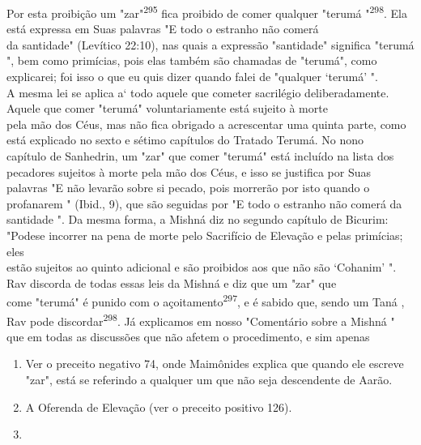 \begin{itemize}
\begin{enumrate}
\begin{itemize}
\begin{itemize}
\begin{itemize}
Por esta proibição um "zar"\textsuperscript{295} fica proibido de comer
qualquer "terumá
"\textsuperscript{298}. Ela está expressa em Suas palavras "E todo o
estranho não comerá\\
da santidade" (Levítico 22:10), nas quais a expressão "santidade"
significa "terumá
", bem como primícias, pois elas também são chamadas de "terumá",
como
explicarei; foi isso o que eu quis dizer quando falei de "qualquer
`terumá' ".\\
A mesma lei se aplica a` todo aquele que cometer sacrilégio
deliberadamente.\\
Aquele que comer "terumá" voluntariamente está sujeito à morte\\
pela mão dos Céus, mas não fica obrigado a acrescentar uma quinta parte,
como
está explicado no sexto e sétimo capítulos do Tratado Terumá. No
nono\\
capítulo de Sanhedrin, um "zar" que comer "terumá" está incluído na
lista dos\\
pecadores sujeitos à morte pela mão dos Céus, e isso se justifica por
Suas palavras
"E não levarão sobre si pecado, pois morrerão por isto quando o
profanarem
" (Ibid., 9), que são seguidas por "E todo o estranho não comerá da
santidade
". Da mesma forma, a Mishná diz no segundo capítulo de Bicurim:
"Podese
incorrer na pena de morte pelo Sacrifício de Elevação e pelas
primícias; eles\\
estão sujeitos ao quinto adicional e são proibidos aos que não são
`Cohanim' ".\\
Rav discorda de todas essas leis da Mishná e diz que um "zar" que\\
come "terumá" é punido com o açoitamento\textsuperscript{297}, e é
sabido que, sendo um Taná
, Rav pode discordar\textsuperscript{298}. Já explicamos em nosso
"Comentário sobre a Mishná
" que em todas as discussões que não afetem o procedimento, e sim
apenas

\begin{enumerate}
\def\labelenumi{\arabic{enumi}.}
\setcounter{enumi}{294}
\item
 
 Ver o preceito negativo 74, onde Maimônides explica que quando ele
 escreve "zar", está se referindo a qualquer um que não seja
 descendente de Aarão.
 
\item
 
 A Oferenda de Elevação (ver o preceito positivo 126).
 
\item
 

\end{enumerate}
\end{itemize}
\end{itemize}
\end{itemize}
\end{enumrate}
\end{itemize}

